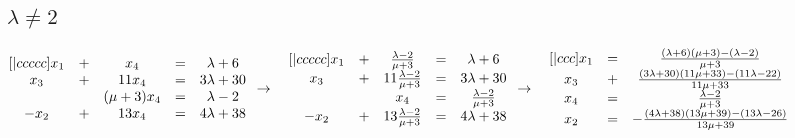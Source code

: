 \documentclass{article}
\begin{document}
    \subsection{\(\lambda \neq 2\)}
    \begin{math}
        \begin{matrix}[|ccccc]
            x_1 & + & x_4 & = & \lambda + 6\\
            x_3 & + & 11x_4 & = & 3\lambda + 30\\
            ~ & ~ & (\mu + 3)x_4 & = & \lambda - 2\\
            -x_2 & + & 13x_4 & = & 4\lambda + 38
        \end{matrix}\\
        \\
        \\
        \to\quad
        \begin{matrix}[|ccccc]
            x_1 & + & \frac{\lambda - 2}{\mu + 3} & = & \lambda + 6\\
            x_3 & + & 11\frac{\lambda - 2}{\mu + 3} & = & 3\lambda + 30\\
            ~ & ~ & x_4 & = & \frac{\lambda - 2}{\mu + 3}\\
            -x_2 & + & 13\frac{\lambda - 2}{\mu + 3} & = & 4\lambda + 38
        \end{matrix}\\
        \\
        \\
        \to\quad
        \begin{matrix}[|ccc]
            x_1 & = & \frac{(\lambda + 6)(\mu + 3) - (\lambda - 2)}{\mu + 3}\\
            x_3 & + & \frac{(3\lambda + 30)(11\mu + 33) - (11\lambda - 22)}{11\mu + 33}\\
            x_4 & = & \frac{\lambda - 2}{\mu + 3}\\
            x_2 & = & -\frac{(4\lambda + 38)(13\mu + 39) - (13\lambda - 26)}{13\mu + 39}
        \end{matrix}
    \end{math}
\end{document}
